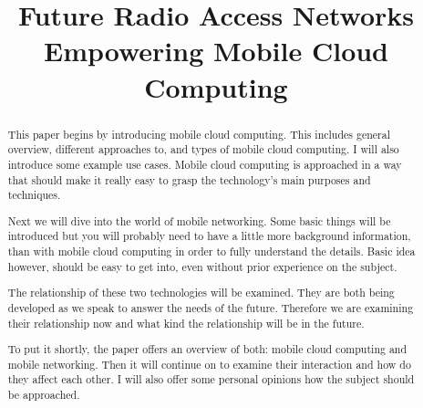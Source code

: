 \documentclass[conference]{IEEEtran}
\begin{document}
\title{Future Radio Access Networks Empowering Mobile Cloud Computing}

\author{
}

\maketitle

\begin{abstract}
This paper begins by introducing mobile cloud computing. This includes general overview, different approaches to, and types of mobile cloud computing. I will also introduce some example use cases. Mobile cloud computing is approached in a way that should make it really easy to grasp the technology's main purposes and techniques.
\par
Next we will dive into the world of mobile networking. Some basic things will be introduced but you will probably need to have a little more background information, than with mobile cloud computing in order to fully understand the details. Basic idea however, should be easy to get into, even without prior experience on the subject.
\par
The relationship of these two technologies will be examined. They are both being developed as we speak to answer the needs of the future. Therefore we are examining their relationship now and what kind the relationship will be in the future.
\par
To put it shortly, the paper offers an overview of both: mobile cloud computing and mobile networking. Then it will continue on to examine their interaction and how do they affect each other. I will also offer some personal opinions how the subject should be approached.
\end{abstract}
\end{document}

